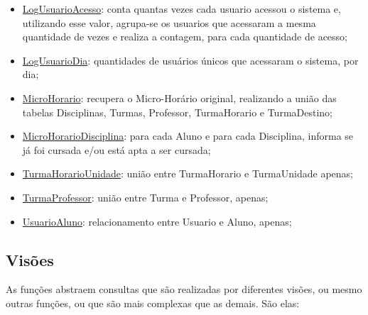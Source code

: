 \documentclass[graduacao,brazil]{ThesisPUC}
\begin{document}
\begin{itemize}
	\item \underline{LogUsuarioAcesso}: conta quantas vezes cada usuario acessou o sistema e, utilizando esse valor, agrupa-se os usuarios que acessaram a mesma quantidade de vezes e realiza a contagem, para cada quantidade de acesso;
	\item \underline{LogUsuarioDia}: quantidades de usuários únicos que acessaram o sistema, por dia;
	\item \underline{MicroHorario}: recupera o Micro-Horário original, realizando a união das tabelas Disciplinas, Turmas, Professor, TurmaHorario e TurmaDestino;
	\item \underline{MicroHorarioDisciplina}: para cada Aluno e para cada Disciplina, informa se já foi cursada e/ou está apta a ser cursada;
	\item \underline{TurmaHorarioUnidade}: união entre TurmaHorario e TurmaUnidade apenas;
	\item \underline{TurmaProfessor}: união entre Turma e Professor, apenas;
	\item \underline{UsuarioAluno}: relacionamento entre Usuario e Aluno, apenas;
\end{itemize}

\subsection{Visões}

As funções abstraem consultas que são realizadas por diferentes visões, ou mesmo outras funções, ou que são mais complexas que as demais. São elas:
\end{document}
